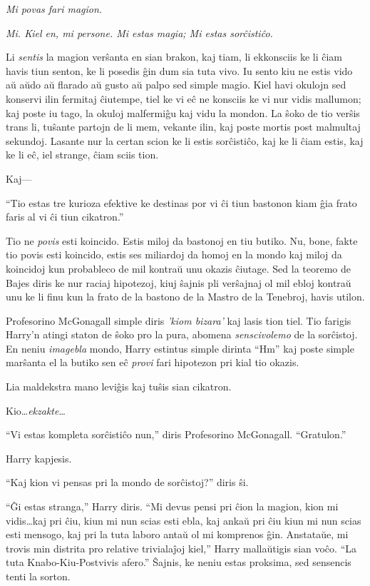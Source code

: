 \emph{Mi povas fari magion.}

\emph{Mi. Kiel en, mi persone. Mi estas magia; Mi estas sorĉistiĉo.}

Li \emph{sentis} la magion verŝanta en sian brakon, kaj tiam, li
ekkonsciis ke li ĉiam havis tiun senton, ke li posedis ĝin dum sia
tuta vivo. Iu sento kiu ne estis vido aŭ aŭdo aŭ flarado aŭ gusto aŭ
palpo sed simple magio. Kiel havi okulojn sed konservi ilin fermitaj
ĉiutempe, tiel ke vi eĉ ne konsciis ke vi nur vidis mallumon; kaj
poste iu tago, la okuloj malfermiĝu kaj vidu la mondon. La ŝoko de
tio verŝis trans li, tuŝante partojn de li mem, vekante ilin, kaj
poste mortis post malmultaj sekundoj. Lasante nur la certan scion ke
li estis sorĉistiĉo, kaj ke li ĉiam estis, kaj ke li eĉ, iel strange,
ĉiam sciis tion.

Kaj—

``Tio estas tre kurioza efektive ke destinas por vi ĉi tiun bastonon
kiam ĝia frato faris al vi ĉi tiun cikatron.''

Tio ne \emph{povis} esti koincido. Estis miloj da bastonoj en tiu
butiko. Nu, bone, fakte tio povis esti koincido, estis ses miliardoj
da homoj en la mondo kaj miloj da koincidoj kun probableco de mil
kontraŭ unu okazis ĉiutage. Sed la teoremo de Bajes diris ke nur
raciaj hipotezoj, kiuj ŝajnis pli verŝajnaj ol mil ebloj kontraŭ unu
ke li finu kun la frato de la bastono de la Mastro de la Tenebroj,
havis utilon.

Profesorino McGonagall simple diris \emph{'kiom bizara'} kaj lasis tion
tiel. Tio farigis Harry'n atingi staton de ŝoko pro la pura, abomena
\emph{senscivolemo} de la sorĉistoj. En neniu \emph{imagebla} mondo,
Harry estintus simple dirinta ``Hm'' kaj poste simple marŝanta el la
butiko sen eĉ \emph{provi} fari hipotezon pri kial tio okazis.

Lia maldekstra mano leviĝis kaj tuŝis sian cikatron.

Kio\ldots \emph{ekzakte}\ldots

``Vi estas kompleta sorĉistiĉo nun,'' diris Profesorino
McGonagall. ``Gratulon.''

Harry kapjesis.

``Kaj kion vi pensas pri la mondo de sorĉistoj?'' diris ŝi.

``Ĝi estas stranga,'' Harry diris. ``Mi devus pensi pri ĉion la magion,
kion mi vidis\ldots kaj pri ĉiu, kiun mi nun scias esti ebla, kaj
ankaŭ pri ĉiu kiun mi nun scias esti mensogo, kaj pri la tuta laboro
antaŭ ol mi komprenos ĝin. Anstataŭe, mi trovis min distrita pro
relative trivialaĵoj kiel,'' Harry mallaŭtigis sian voĉo. ``La tuta
Knabo-Kiu-Postvivis afero.''  Ŝajnis, ke neniu estas proksima, sed
sensencis tenti la sorton.


